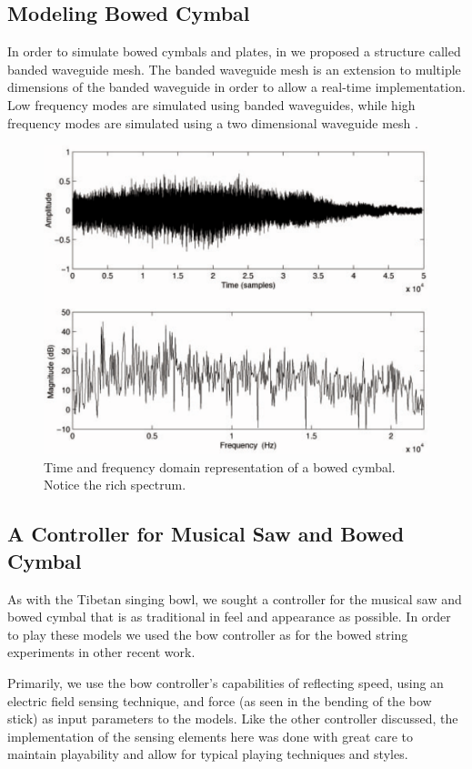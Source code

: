 \subsection{Modeling Bowed Cymbal}
In order to simulate bowed cymbals and plates, in  \cite{Serafin:2001} we proposed a structure called banded waveguide mesh. The banded waveguide mesh is an extension to multiple dimensions of the banded waveguide in order to allow a real-time implementation. Low frequency modes are simulated using banded waveguides, while high frequency modes are simulated using a two dimensional waveguide mesh  \cite{Duyne:1993}.

\begin{figure}[t]
\centering
\includegraphics[width=\textwidth]{cymbal.pdf}
\caption{Time and frequency domain representation of a
bowed cymbal. Notice the rich spectrum.}
  \label{Serafin:fig:3}
\end{figure}


\subsection{A Controller for Musical Saw and Bowed Cymbal}

As with the Tibetan singing bowl, we sought a controller
for the musical saw and bowed cymbal that is as traditional in feel and appearance as possible. In order to play these models we used the bow controller as for the bowed string experiments in other recent work.

Primarily, we use the bow controller's capabilities of reflecting speed, using an electric field sensing technique, and force (as seen in the bending of the bow stick) as input parameters to the models. Like the other controller discussed, the implementation of the sensing elements here was done with great care to maintain playability and allow for typical playing techniques and styles.


